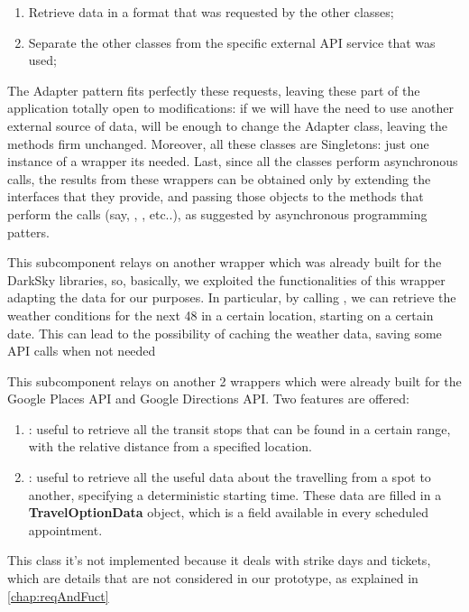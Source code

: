 \begin{enumerate}
\item Retrieve data in a format that was requested by the other classes;
\item Separate the other classes from the specific external API service that was used;
\end{enumerate}

The Adapter pattern fits perfectly these requests, leaving these part of the application totally open to modifications: if we will have the need to use another external source of data, will be enough to change the Adapter class, leaving the methods firm unchanged.
Moreover, all these classes are Singletons: just one instance of a wrapper its needed.
Last, since all the classes perform asynchronous calls, the results from these wrappers can be obtained only by extending the interfaces that they provide, and passing those objects to the methods that perform the calls (say, , , etc..), as suggested by asynchronous programming patters.

This subcomponent relays on another wrapper which was already built for the DarkSky libraries, so, basically, we exploited the functionalities of this wrapper adapting the data for our purposes. In particular, by calling , we can retrieve the weather conditions for the next 48 in a certain location, starting on a certain date. This can lead to the possibility of caching the weather data, saving some API calls when not needed

This subcomponent relays on another 2 wrappers which were already built for the Google Places API and Google Directions API. Two features are offered:

\begin{enumerate}
\item {}: useful to retrieve all the transit stops that can be found in a certain range, with the relative distance from a specified location.
\item {}: useful to retrieve all the useful data about the travelling from a spot to another, specifying a deterministic starting time. These data are filled in a \textbf{TravelOptionData} object, which is a field available in every scheduled appointment.
\end{enumerate}

This class it's not implemented because it deals with strike days and tickets, which are details that are not considered in our prototype, as explained in \ref{chap:reqAndFuct}


